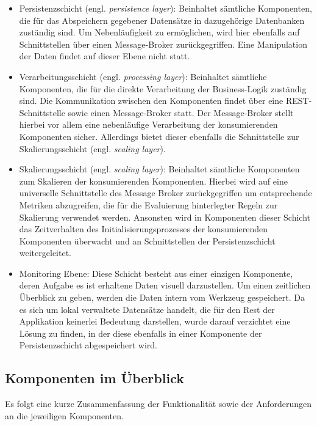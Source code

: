 \begin{itemize}
  \item Persistenzschicht (engl. \emph{persistence layer}): Beinhaltet sämtliche Komponenten, die für das Abspeichern gegebener Datensätze in dazugehörige Datenbanken zuständig sind. Um Nebenläufigkeit zu ermöglichen, wird hier ebenfalls auf Schnittstellen über einen Message-Broker zurückgegriffen. Eine Manipulation der Daten findet auf dieser Ebene nicht statt.
  \item Verarbeitungsschicht (engl. \emph{processing layer}): Beinhaltet sämtliche Komponenten, die für die direkte Verarbeitung der Business-Logik zuständig sind. Die Kommunikation zwischen den Komponenten findet über eine REST-Schnittstelle sowie einen Message-Broker statt. Der Message-Broker stellt hierbei vor allem eine nebenläufige Verarbeitung der konsumierenden Komponenten sicher. Allerdings bietet dieser ebenfalls die Schnittstelle zur Skalierungsschicht (engl. \emph{scaling layer}).
  \item Skalierungsschicht (engl. \emph{scaling layer}): Beinhaltet sämtliche Komponenten zum Skalieren der konsumierenden Komponenten. Hierbei wird auf eine universelle Schnittstelle des Message Broker zurückgegriffen um entsprechende Metriken abzugreifen, die für die Evaluierung hinterlegter Regeln zur Skalierung verwendet werden. Ansonsten wird in Komponenten dieser Schicht das Zeitverhalten des Initialisierungsprozesses der konsumierenden Komponenten überwacht und an Schnittstellen der Persistenzschicht weitergeleitet.
  \item Monitoring Ebene: Diese Schicht besteht aus einer einzigen Komponente, deren Aufgabe es ist erhaltene Daten visuell darzustellen. Um einen zeitlichen Überblick zu geben, werden die Daten intern vom Werkzeug gespeichert. Da es sich um lokal verwaltete Datensätze handelt, die für den Rest der Applikation keinerlei Bedeutung darstellen, wurde darauf verzichtet eine Lösung zu finden, in der diese ebenfalls in einer Komponente der Persistenzschicht abgespeichert wird.
\end{itemize}

\subsection{Komponenten im Überblick}
Es folgt eine kurze Zusammenfassung der Funktionalität sowie der Anforderungen an die jeweiligen Komponenten.

